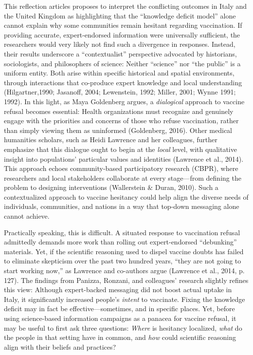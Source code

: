 \documentclass[authordate, reflection,issue]{jote-new-article}
\begin{document}
	This reflection articles proposes to interpret the conflicting outcomes in Italy and the United Kingdom as highlighting that the “knowledge deficit model” alone cannot explain why some communities remain hesitant regarding vaccination. If providing accurate, expert-endorsed information were universally sufficient, the researchers would very likely not find such a divergence in responses. Instead, their results underscore a “contextualist” perspective advocated by historians, sociologists, and philosophers of science: Neither “science” nor “the public” is a uniform entity. Both arise within specific historical and spatial environments, through interactions that co-produce expert knowledge and local understanding (Hilgartner,1990; Jasanoff, 2004; Lewenstein, 1992; Miller, 2001; Wynne 1991; 1992). In this light, as Maya Goldenberg argues, a \emph{dialogical} approach to vaccine refusal becomes essential: Health organizations must recognize and genuinely engage with the priorities and concerns of those who refuse vaccination, rather than simply viewing them as uninformed (Goldenberg, 2016). Other medical humanities scholars, such as Heidi Lawrence and her colleagues, further emphasize that this dialogue ought to begin at the \emph{local} level, with qualitative insight into populations' particular values and identities (Lawrence et al., 2014). This approach echoes community-based participatory research (CBPR), where researchers and local stakeholders collaborate at every stage—from defining the problem to designing interventions (Wallerstein \& Duran, 2010). Such a contextualized approach to vaccine hesitancy could help align the diverse needs of individuals, communities, and nations in a way that top-down messaging alone cannot achieve.







	Practically speaking, this is difficult. A situated response to vaccination refusal admittedly demands more work than rolling out expert-endorsed “debunking” materials. Yet, if the scientific reasoning used to dispel vaccine doubts has failed to eliminate skepticism over the past two hundred years, “they are not going to start working now,” as Lawrence and co-authors argue (Lawrence et al., 2014, p. 127). The findings from Panizza, Ronzani, and colleagues' research slightly refines this view: Although expert-backed messaging did not boost actual uptake in Italy, it significantly increased people's \emph{intent} to vaccinate. Fixing the knowledge deficit may in fact be effective—sometimes, and in specific places. Yet, before using science-based information campaigns as a panacea for vaccine refusal, it may be useful to first ask three questions: \emph{Where} is hesitancy localized, \emph{what} do the people in that setting have in common, and \emph{how} could scientific reasoning align with their beliefs and practices?
\end{document}
